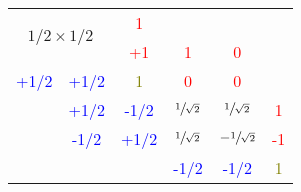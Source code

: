 \documentclass[../main.tex]{subfiles}
\begin{document}
\begin{itemize}
\begin{table}[!h]
\centering
\begin{tabular}{ccc|ccc}
\cline{3-3}
\multicolumn{2}{c|}{\multirow{2}{*}{$1/2\times 1/2$}}       & \textcolor{red}{1}    &      &                           &                         \\ \cline{4-5}
\multicolumn{2}{c|}{}                                 & \textcolor{red}{+1}    & \textcolor{red}{1}    & \multicolumn{1}{c|}{\textcolor{red}{0}}    &                         \\ \cline{1-3}
\multicolumn{1}{|c}{\textcolor{blue}{+1/2}} & \multicolumn{1}{c|}{\textcolor{blue}{+1/2}} & \textcolor{olive}{1}    & \textcolor{red}{0}    & \multicolumn{0}{c|}{\textcolor{red}{0}}    &                         \\ \hline
\multicolumn{1}{c|}{}     & \textcolor{blue}{+1/2}                      & \textcolor{blue}{-1/2} & \textcolor{purple}{$\sfrac{1}{\sqrt{2}}$}  & \multicolumn{1}{c|}{\textcolor{purple}{$\sfrac{1}{\sqrt{2}}$}}  & \multicolumn{1}{c|}{\textcolor{red}{1}}  \\
\multicolumn{1}{c|}{}     & \textcolor{blue}{\textcolor{blue}{-1/2}}                      & \textcolor{blue}{+1/2} & \textcolor{purple}{$\sfrac{1}{\sqrt{2}}$}  & \multicolumn{1}{c|}{\textcolor{purple}{$-\sfrac{1}{\sqrt{2}}$}} & \multicolumn{1}{c|}{\textcolor{red}{-1}} \\ \cline{2-6} 
                          &                           &      & \textcolor{blue}{-1/2} & \multicolumn{1}{c|}{\textcolor{blue}{-1/2}} & \multicolumn{1}{c|}{\textcolor{olive}{1}}  \\ \cline{4-6} 
\end{tabular}
\end{table}


\end{itemize}
\end{document}
